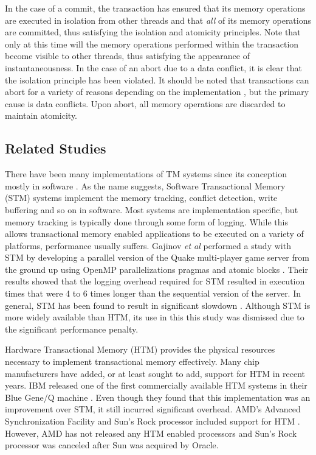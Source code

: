 \documentclass{sig-alternate}
\begin{document}
In the case of a commit, the transaction has ensured that its memory operations are
executed in isolation from other threads and that \emph{all} of its memory operations are
committed, thus satisfying the isolation and atomicity principles.  Note that only at this
time will the memory operations performed within the transaction become visible to other
threads, thus satisfying the appearance of instantaneousness.  In the case of an abort due
to a data conflict, it is clear that the isolation principle has been violated.  It should
be noted that transactions can abort for a variety of reasons depending on the
implementation \cite{intel_opt_man,chung_amd}, but the primary cause is data conflicts.
Upon abort, all memory operations are discarded to maintain atomicity.

\subsection{Related Studies}

There have been many implementations of TM systems since its conception mostly in software
\cite{yoo_tsx,chitters_tsx,rock_dice,chung_amd,blue_wang,quake_stm,stm_cascaval}.  As the
name suggests, Software Transactional Memory (STM) systems implement the memory tracking,
conflict detection, write buffering and so on in software.  Most systems are
implementation specific, but memory tracking is typically done through some form of
logging.  While this allows transactional memory enabled applications to be executed on a
variety of platforms, performance usually suffers.  Gajinov \emph{et al} performed a study
with STM by developing a parallel version of the Quake multi-player game server from the
ground up using OpenMP parallelizations pragmas and atomic blocks \cite{quake_stm}.  Their
results showed that the logging overhead required for STM resulted in execution times that
were 4 to 6 times longer than the sequential version of the server.  In general, STM has
been found to result in significant slowdown \cite{stm_cascaval}.  Although STM is more
widely available than HTM, its use in this this study was dismissed due to the significant
performance penalty.

Hardware Transactional Memory (HTM) provides the physical resources necessary to implement
transactional memory effectively.  Many chip manufacturers have added, or at least sought
to add, support for HTM in recent years.  IBM released one of the first commercially
available HTM systems in their Blue Gene/Q machine \cite{blue_wang}.  Even though they
found that this implementation was an improvement over STM, it still incurred significant
overhead.  AMD's Advanced Synchronization Facility and Sun's Rock processor included
support for HTM \cite{chung_amd,rock_dice}.  However, AMD has not released any HTM enabled
processors and Sun's Rock processor was canceled after Sun was acquired by Oracle.
\end{document}

